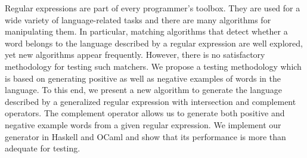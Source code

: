 Regular expressions are part of every programmer's toolbox.  They are
used for a wide variety of language-related tasks and there are many algorithms for
manipulating them. In particular, matching algorithms that detect
whether a word belongs to the language described by a regular
expression are well explored, 
yet new algorithms appear frequently. However, there is
no satisfactory methodology for testing such matchers.
%
We propose a testing methodology which is based on generating positive
as well as negative examples of words in the language. To this end, we
present a new algorithm to generate the language described by a
generalized regular expression with intersection and complement
operators.  The complement operator allows us to generate both
positive and negative example words from a given regular expression.
We implement our generator in Haskell and OCaml and show that its
performance is more than adequate for testing.

